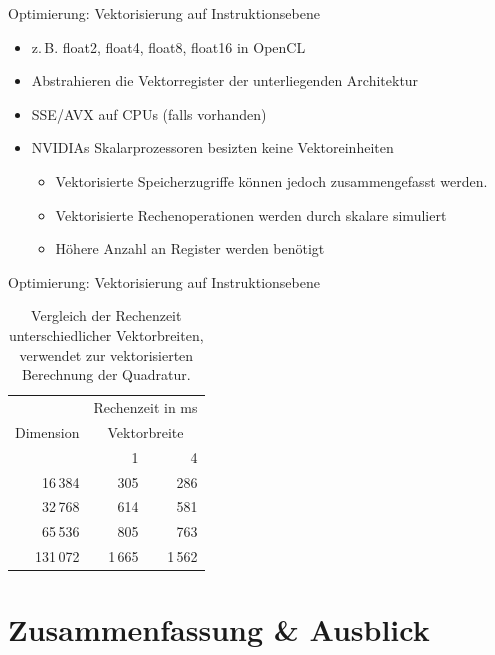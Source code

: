 \documentclass[10pt]{beamer}
\begin{document}
\begin{frame}{Optimierung: Vektorisierung auf Instruktionsebene}
  \begin{itemize}
    \item z.\,B. float2, float4, float8, float16 in OpenCL
    \item Abstrahieren die Vektorregister der unterliegenden Architektur
    \item SSE/AVX auf CPUs (falls vorhanden)
    \item NVIDIAs Skalarprozessoren besizten keine Vektoreinheiten
    \begin{itemize}
      \item Vektorisierte Speicherzugriffe können jedoch zusammengefasst
            werden.
      \item Vektorisierte Rechenoperationen werden durch skalare simuliert
      \item Höhere Anzahl an Register werden benötigt
    \end{itemize}
  \end{itemize}
\end{frame}

\begin{frame}{Optimierung: Vektorisierung auf Instruktionsebene}
  \begin{table}[ht]\label{tab:vec}
    \begin{tabular}{rrr} \toprule
      \multirow{3}{*}{Dimension} & \multicolumn{2}{c}{Rechenzeit in ms} \\ 
      \cmidrule{2-3}
      & \multicolumn{2}{c}{Vektorbreite} \\ \cmidrule{2-3}
      & 1 & 4 \\ \midrule
       16\,384 &    305 &    286 \\
       32\,768 &    614 &    581 \\
       65\,536 &    805 &    763 \\
      131\,072 & 1\,665 & 1\,562 \\
      \bottomrule
    \end{tabular}
    \caption{Vergleich der Rechenzeit unterschiedlicher Vektorbreiten, 
             verwendet zur vektorisierten Berechnung der Quadratur.}
  \end{table}
\end{frame}

\section{Zusammenfassung \& Ausblick}
\end{document}
